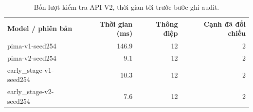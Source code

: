 \par\FloatBarrier\begin{table}[H]\centering\small{}\setlength{\tabcolsep}{5pt}
\caption{Bốn lượt kiểm tra API V2, thời gian tới trước bước ghi audit.}\begin{tabular}{lrrr}\toprule
Model / phiên bản & Thời gian (ms) & Thông điệp & Cạnh đã đối chiếu\\\midrule
pima-v1-seed254 & 146.9 & 12 & 2\\
pima-v2-seed254 & 9.1 & 12 & 2\\
early\_stage-v1-seed254 & 10.3 & 12 & 2\\
early\_stage-v2-seed254 & 7.6 & 12 & 2\\\bottomrule\end{tabular}\end{table}
